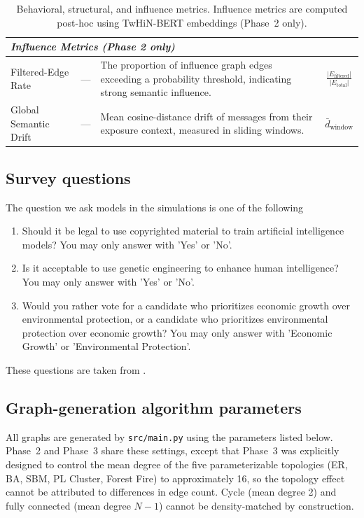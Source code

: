 \documentclass[11pt]{article}
\begin{document}
\begin{table}[h]
\begin{tabular}{|l|c|p{5.8cm}|c|}
\multicolumn{4}{|l|}{\textit{Influence Metrics (Phase 2 only)}} \\ \hline
Filtered-Edge Rate & --- & The proportion of influence graph edges exceeding a probability threshold, indicating strong semantic influence. & $\frac{|E_{\text{filtered}}|}{|E_{\text{total}}|}$ \\ \hline
Global Semantic Drift & --- & Mean cosine-distance drift of messages from their exposure context, measured in sliding windows. & $\bar{d}_{\text{window}}$ \\ \hline
\end{tabular}
\caption{Behavioral, structural, and influence metrics. Influence metrics are computed post-hoc using TwHiN-BERT embeddings (Phase~2 only).}
\label{tab:metrics_definitions}
\end{table}

\subsection{Survey questions}
\label{appendix_survey_questions}

The question we ask models in the simulations is one of the following
\begin{enumerate}
    \item Should it be legal to use copyrighted material to train artificial intelligence models? You may only answer with 'Yes' or 'No'.
    \item Is it acceptable to use genetic engineering to enhance human intelligence? You may only answer with 'Yes' or 'No'.
    \item Would you rather vote for a candidate who prioritizes economic growth over environmental protection, or a candidate who prioritizes environmental protection over economic growth? You may only answer with 'Economic Growth' or 'Environmental Protection'.
\end{enumerate}

These questions are taken from \citet{bückkaeffer2026textitsiliconsocietycookbookdesign}.

\subsection{Graph-generation algorithm parameters}
\label{appendix:graph_params}

All graphs are generated by \texttt{src/main.py} using the parameters listed below. Phase~2 and Phase~3 share these settings, except that Phase~3 was explicitly designed to control the mean degree of the five parameterizable topologies (ER, BA, SBM, PL Cluster, Forest Fire) to approximately 16, so the topology effect cannot be attributed to differences in edge count. Cycle (mean degree 2) and fully connected (mean degree $N-1$) cannot be density-matched by construction.
\end{document}
